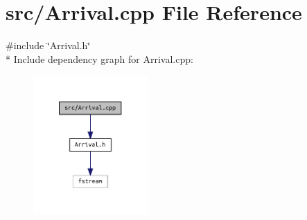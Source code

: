 \section{src/\+Arrival.cpp File Reference}
\label{_arrival_8cpp}
{\ttfamily \#include \char`\"{}Arrival.\+h\char`\"{}}\\*
Include dependency graph for Arrival.\+cpp\+:\nopagebreak
\begin{figure}[H]
\begin{center}
\leavevmode
\includegraphics[width=124pt]{_arrival_8cpp__incl}
\end{center}
\end{figure}
